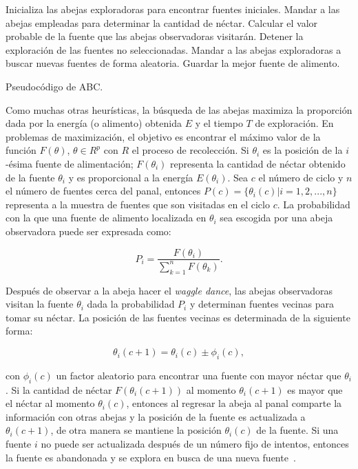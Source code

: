 \begin{algorithm}
  \begin{algorithmic}[1]
      \Repeat
        \State Inicializa las abejas exploradoras para encontrar fuentes
        iniciales.
        \State Mandar a las abejas empleadas para determinar la cantidad de
        néctar.
        \State Calcular el valor probable de la fuente que las abejas
        observadoras visitarán.
        \State Detener la exploración de las fuentes no seleccionadas.
        \State Mandar a las abejas exploradoras a buscar nuevas fuentes de forma
        aleatoria.
        \State Guardar la mejor fuente de alimento.
    \EndProcedure
  \end{algorithmic}
  \caption{Pseudocódigo de ABC.}
  \label{code:bee-steps}
\end{algorithm}

Como muchas otras heurísticas, la búsqueda de las abejas maximiza la proporción
dada por la energía (o alimento) obtenida $E$ y el tiempo $T$ de exploración.
En problemas de maximización, el objetivo es encontrar el máximo valor de la
función $F(\theta)$, $\theta \in R^{p}$ con $R$ el proceso de
recolección. Si $\theta_{i}$ es la posición de la $i$-ésima fuente de
alimentación; $F(\theta_{i})$ representa la cantidad de néctar obtenido de la
fuente $\theta_{i}$ y es proporcional a la energía $E(\theta_{i})$. Sea $c$ el
número de ciclo y $n$ el número de fuentes cerca del panal, entonces
$P(c) = \{\theta_{i}(c) | i = 1,2,...,n\}$ representa a la muestra de fuentes
que son visitadas en el ciclo $c$. La probabilidad con la que una fuente de
alimento localizada en $\theta_{i}$ sea escogida por una abeja observadora puede ser
expresada como:

\begin{displaymath}
  P_{i} = \frac{F(\theta_{i})}{\sum_{k=1}^{n} F(\theta_{k})}.
\end{displaymath}

Después de observar a la abeja hacer el \textit{waggle dance}, las abejas
observadoras visitan la fuente $\theta_{i}$ dada la probabilidad $P_{i}$ y
determinan fuentes vecinas para tomar su néctar. La posición de las fuentes
vecinas es determinada de la siguiente forma:

\begin{displaymath}
  \theta_{i}(c+1) = \theta_{i}(c) \pm \phi_{i}(c),
\end{displaymath}

\noindent
con $\phi_{i}(c)$ un factor aleatorio para encontrar una fuente con mayor
néctar que $\theta_{i}$. Si la cantidad de néctar $F(\theta_{i}(c+1))$ al
momento $\theta_{i}(c+1)$ es mayor que el néctar al momento $\theta_{i}(c)$,
entonces al regresar la abeja al panal comparte la información con otras abejas
y la posición de la fuente es actualizada a $\theta_{i}(c+1)$, de otra manera
se mantiene la posición $\theta_{i}(c)$ de la fuente. Si una fuente $i$ no
puede ser actualizada después de un número fijo de intentos, entonces la
fuente es abandonada y se explora en busca de una nueva
fuente~\cite{karaboga2008performance}.

